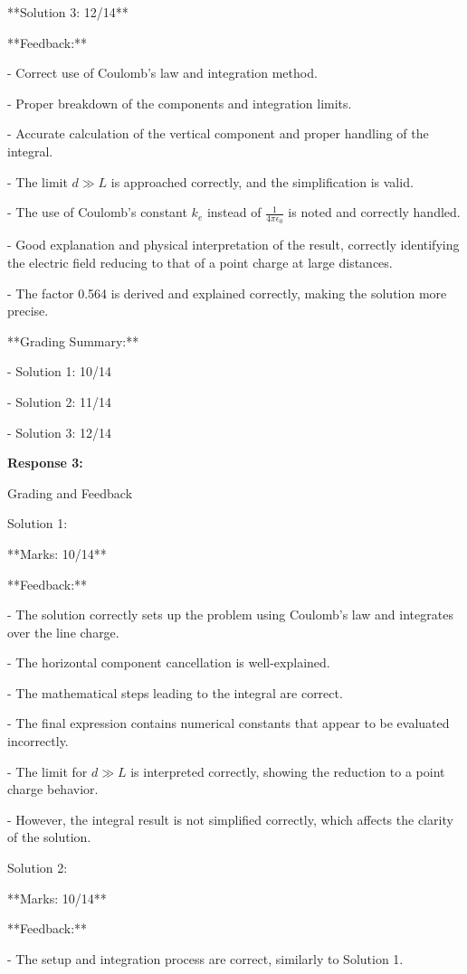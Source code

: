 \documentclass[a4paper,11pt]{article}
\begin{document}
**Solution 3: 12/14**

**Feedback:**

- Correct use of Coulomb's law and integration method.

- Proper breakdown of the components and integration limits.

- Accurate calculation of the vertical component and proper handling of the integral.

- The limit \( d \gg L \) is approached correctly, and the simplification is valid.

- The use of Coulomb's constant \( k_e \) instead of \( \frac{1}{4\pi\epsilon_0} \) is noted and correctly handled.

- Good explanation and physical interpretation of the result, correctly identifying the electric field reducing to that of a point charge at large distances.

- The factor 0.564 is derived and explained correctly, making the solution more precise.

**Grading Summary:**

- Solution 1: 10/14

- Solution 2: 11/14

- Solution 3: 12/14

\bigskip
\textbf{Response 3:}

Grading and Feedback

Solution 1:

**Marks: 10/14**

**Feedback:**

- The solution correctly sets up the problem using Coulomb's law and integrates over the line charge.

- The horizontal component cancellation is well-explained.

- The mathematical steps leading to the integral are correct.

- The final expression contains numerical constants that appear to be evaluated incorrectly.

- The limit for \( d \gg L \) is interpreted correctly, showing the reduction to a point charge behavior.

- However, the integral result is not simplified correctly, which affects the clarity of the solution.

Solution 2:

**Marks: 10/14**

**Feedback:**

- The setup and integration process are correct, similarly to Solution 1.
\end{document}
